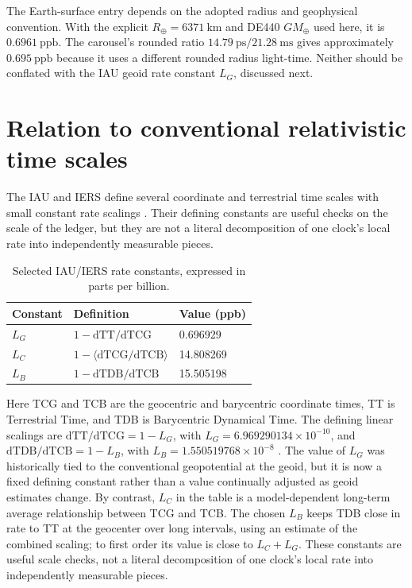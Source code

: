 \documentclass[12pt]{article}
\begin{document}
The Earth-surface entry depends on the adopted radius and geophysical convention. With the explicit $R_{\oplus}=6371\ \mathrm{km}$ and DE440 $GM_{\oplus}$ used here, it is $0.6961\ \mathrm{ppb}$. The carousel's rounded ratio $14.79\ \mathrm{ps}/21.28\ \mathrm{ms}$ gives approximately $0.695\ \mathrm{ppb}$ because it uses a different rounded radius light-time. Neither should be conflated with the IAU geoid rate constant $L_G$, discussed next.

\section{Relation to conventional relativistic time scales}

The IAU and IERS define several coordinate and terrestrial time scales with small constant rate scalings \cite{Luzum2011,IERS2010}. Their defining constants are useful checks on the scale of the ledger, but they are not a literal decomposition of one clock's local rate into independently measurable pieces.

\begin{table}[ht]
  \centering
  \caption{Selected IAU/IERS rate constants, expressed in parts per billion.}
  \label{tab:timescale-constants}
  \begin{tabular}{lll}
    \toprule
    Constant & Definition & Value (ppb) \\
    \midrule
    $L_G$ & $1-\mathrm{dTT}/\mathrm{dTCG}$ & 0.696929 \\
    $L_C$ & $1-\langle\mathrm{dTCG}/\mathrm{dTCB}\rangle$ & 14.808269 \\
    $L_B$ & $1-\mathrm{dTDB}/\mathrm{dTCB}$ & 15.505198 \\
    \bottomrule
  \end{tabular}
\end{table}

Here TCG and TCB are the geocentric and barycentric coordinate times, TT is Terrestrial Time, and TDB is Barycentric Dynamical Time. The defining linear scalings are $\mathrm{dTT}/\mathrm{dTCG}=1-L_G$, with $L_G=6.969290134\times10^{-10}$, and $\mathrm{dTDB}/\mathrm{dTCB}=1-L_B$, with $L_B=1.550519768\times10^{-8}$ \cite{Luzum2011,IERS2010}. The value of $L_G$ was historically tied to the conventional geopotential at the geoid, but it is now a fixed defining constant rather than a value continually adjusted as geoid estimates change. By contrast, $L_C$ in the table is a model-dependent long-term average relationship between TCG and TCB. The chosen $L_B$ keeps TDB close in rate to TT at the geocenter over long intervals, using an estimate of the combined scaling; to first order its value is close to $L_C+L_G$. These constants are useful scale checks, not a literal decomposition of one clock's local rate into independently measurable pieces.
\end{document}
